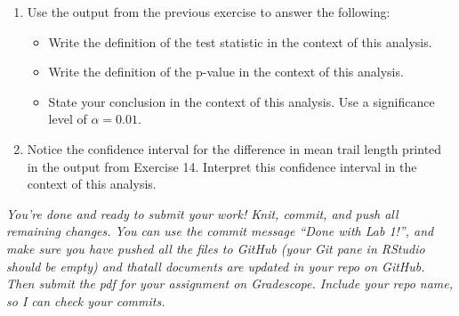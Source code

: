 \documentclass[
]{article}
\providecommand{\tightlist}{%
  \setlength{\itemsep}{0pt}\setlength{\parskip}{0pt}}
\begin{document}
\begin{enumerate}
\def\labelenumi{\arabic{enumi}.}
\setcounter{enumi}{14}
\tightlist
\item
  Use the output from the previous exercise to answer the following:

  \begin{itemize}
  \tightlist
  \item
    Write the definition of the test statistic in the context of this
    analysis.
  \item
    Write the definition of the p-value in the context of this analysis.
  \item
    State your conclusion in the context of this analysis. Use a
    significance level of \(\alpha = 0.01\).
  \end{itemize}
\item
  Notice the confidence interval for the difference in mean trail length
  printed in the output from Exercise 14. Interpret this confidence
  interval in the context of this analysis.
\end{enumerate}

\emph{You're done and ready to submit your work! Knit, commit, and push
all remaining changes. You can use the commit message ``Done with Lab
1!'', and make sure you have pushed all the files to GitHub (your Git
pane in RStudio should be empty) and thatall documents are updated in
your repo on GitHub. Then submit the pdf for your assignment on
Gradescope. Include your repo name, so I can check your commits.}
\end{document}
